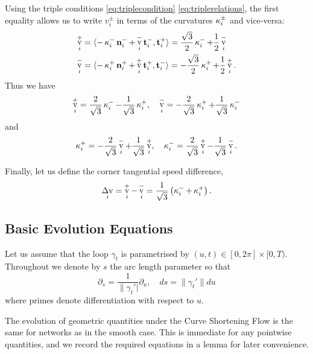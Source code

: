 \documentclass[11pt]{amsart}
\DeclareMathOperator{\tangspeed}{v}
\DeclareMathOperator{\corneranglespeed}{{\Delta v}}
\begin{document}
Using the triple conditions \eqref{eq:triplecondition} \eqref{eq:triplerelations}, the first equality allows us to write \(v_i^{\pm}\) in terms of the curvatures \(\operatorname{\kappa}_i^{\pm}\) and vice-versa:
\begin{align*}
\tangspeed_i^+ &= \ip{-\curvecurv_i^- \nor_i^- + \tangspeed_i^- \tang_i^-}{\tang_i^+} = \frac{\sqrt{3}}{2} \curvecurv_i^- + \frac{1}{2} \tangspeed_i^- \\
\tangspeed_i^- &= \ip{-\curvecurv_i^+ \nor_i^+ + \tangspeed_i^+ \tang_i^+}{\tang_i^-} = - \frac{\sqrt{3}}{2} \curvecurv_i^+ + \frac{1}{2} \tangspeed_i^+.
\end{align*}
Thus we have
\begin{equation}
\label{eq:tangspeedcurvture}
\tangspeed_i^+ = \frac{2}{\sqrt{3}} \curvecurv_i^- - \frac{1}{\sqrt{3}} \curvecurv_i^+, \quad \tangspeed_i^- = -\frac{2}{\sqrt{3}} \curvecurv_i^+ + \frac{1}{\sqrt{3}} \curvecurv_i^-
\end{equation}
and
\begin{equation}
\label{eq:curvturetangentialspeed}
\curvecurv_i^+ = -\frac{2}{\sqrt{3}} \tangspeed_i^- + \frac{1}{\sqrt{3}} \tangspeed_i^+, \quad \curvecurv_i^- = \frac{2}{\sqrt{3}} \tangspeed_i^+ - \frac{1}{\sqrt{3}} \tangspeed_i^-.
\end{equation}

Finally, let us define the corner tangential speed difference,
\begin{equation}
\label{eq:cornerspeed}
\corneranglespeed_i = \tangspeed_i^+ - \tangspeed_i^- = \frac{1}{\sqrt{3}} \left(\curvecurv_i^- + \curvecurv_i^+\right).
\end{equation}

\subsection{Basic Evolution Equations}
\label{sec:orgheadline4}

Let us assume that the loop \(\gamma_t\) is parametrised by \((u, t) \in [0, 2\pi] \times [0, T)\). Throughout we denote by \(s\) the arc length parameter so that
\[
\partial_s = \frac{1}{\|\gamma_t'|} \partial_u, \quad ds = \|\gamma_t'\| du
\]
where primes denote differentiation with respect to \(u\).

The evolution of geometric quantities under the Curve Shortening Flow is the same for networks as in the smooth case. This is immediate for any pointwise quantities, and we record the required equations in a lemma for later convenience.
\end{document}
